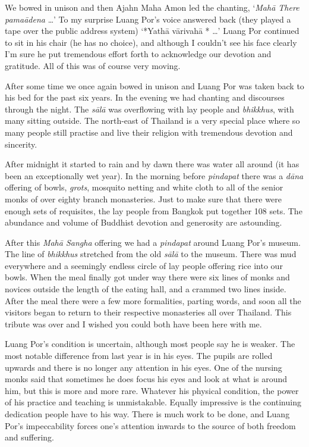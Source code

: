 We bowed in unison and then Ajahn Maha Amon led the chanting, 
`\emph{Mahā There pamaādena} \ldots{}' To my surprise Luang Por's voice
answered back (they played a tape over the public address system) 
`*Yathā vārivahā * \ldots{}' Luang Por continued to sit in his chair (he
has no choice), and although I couldn't see his face clearly I'm sure he
put tremendous effort forth to acknowledge our devotion and gratitude. 
All of this was of course very moving. 

After some time we once again bowed in unison and Luang Por was taken
back to his bed for the past six years. In the evening we had chanting
and discourses through the night. The \emph{sālā} was overflowing with
lay people and \emph{bhikkhus}, with many sitting outside. The
north-east of Thailand is a very special place where so many people
still practise and live their religion with tremendous devotion and
sincerity. 

After midnight it started to rain and by dawn there was water all around
 (it has been an exceptionally wet year). In the morning before
\emph{pindapat} there was a \emph{dāna} offering of bowls, \emph{grots}, 
mosquito netting and white cloth to all of the senior monks of over
eighty branch monasteries. Just to make sure that there were enough sets
of requisites, the lay people from Bangkok put together 108 sets. The
abundance and volume of Buddhist devotion and generosity are astounding. 

After this \emph{Mahā Sangha} offering we had a \emph{pindapat} around
Luang Por's museum. The line of \emph{bhikkhus} stretched from the old
\emph{sālā} to the museum. There was mud everywhere and a seemingly
endless circle of lay people offering rice into our bowls. When the meal
finally got under way there were six lines of monks and novices outside
the length of the eating hall, and a crammed two lines inside. After the
meal there were a few more formalities, parting words, and soon all the
visitors began to return to their respective monasteries all over
Thailand. This tribute was over and I wished you could both have been
here with me. 

Luang Por's condition is uncertain, although most people say he is
weaker. The most notable difference from last year is in his eyes. The
pupils are rolled upwards and there is no longer any attention in his
eyes. One of the nursing monks said that sometimes he does focus his
eyes and look at what is around him, but this is more and more rare. 
Whatever his physical condition, the power of his practice and teaching
is unmistakable. Equally impressive is the continuing dedication people
have to his way. There is much work to be done, and Luang Por's
impeccability forces one's attention inwards to the source of both
freedom and suffering. 

